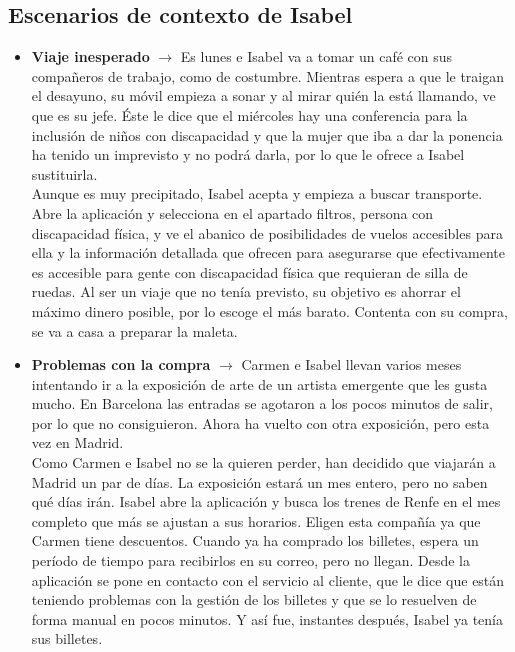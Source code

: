 \subsection{Escenarios de contexto de Isabel}
\begin{itemize}
    \item \textbf{Viaje inesperado} $\rightarrow$ Es lunes e Isabel va a tomar un café con sus compañeros de trabajo, como de costumbre. Mientras espera 
    a que le traigan el desayuno, su móvil empieza a sonar y al mirar quién la está llamando, ve que es su jefe. Éste le dice que el miércoles hay una 
    conferencia para la inclusión de niños con discapacidad y que la mujer que iba a dar la ponencia ha tenido un imprevisto y no podrá darla, por 
    lo que le ofrece a Isabel sustituirla. \\

    Aunque es muy precipitado, Isabel acepta y empieza a buscar transporte. Abre la aplicación y selecciona en el apartado filtros, persona 
    con discapacidad física, y ve el abanico de posibilidades de vuelos accesibles para ella y la información detallada que ofrecen para asegurarse 
    que efectivamente es accesible para gente con discapacidad física que requieran de silla de ruedas. Al ser un viaje que no tenía previsto, su objetivo 
    es ahorrar el máximo dinero posible, por lo escoge el más barato. Contenta con su compra, se va a casa a preparar la maleta.
    \item \textbf{Problemas con la compra} $\rightarrow$ Carmen e Isabel llevan varios meses intentando ir a la exposición de arte de un artista emergente 
    que les gusta mucho. En Barcelona las entradas se agotaron a los pocos minutos de salir, por lo que no consiguieron. Ahora ha vuelto con otra exposición, 
    pero esta vez en Madrid. \\

    Como Carmen e Isabel no se la quieren perder, han decidido que viajarán a Madrid un par de días. La exposición estará un mes entero, pero no saben qué días irán.
    Isabel abre la aplicación y busca los trenes de Renfe en el mes completo que más se ajustan a sus horarios. Eligen esta compañía ya que Carmen tiene descuentos. 
    Cuando ya ha comprado los billetes, espera un período de tiempo para recibirlos en su correo, pero no llegan. Desde la aplicación se pone en contacto con el 
    servicio al cliente, que le dice que están teniendo problemas con la gestión de los billetes y que se lo resuelven de forma manual en pocos minutos. Y así fue, 
    instantes después, Isabel ya tenía sus billetes.
\end{itemize}

